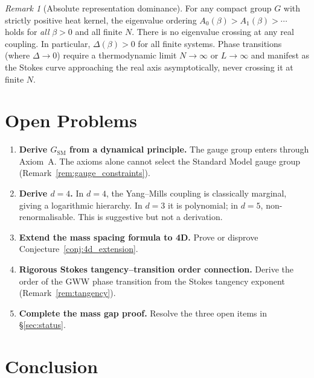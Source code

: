\documentclass[12pt]{article}
\theoremstyle{definition}
\theoremstyle{remark}
\newtheorem{remark}[theorem]{Remark}
\newcommand{\SM}{\mathrm{SM}}
\begin{document}
\begin{remark}[Absolute representation dominance]
\label{rem:absolute_dominance}
For any compact group $G$ with strictly positive heat kernel,
the eigenvalue ordering $A_0(\beta) > A_1(\beta) > \cdots$ holds
for \emph{all} $\beta > 0$ and all finite $N$.  There is no eigenvalue
crossing at any real coupling.  In particular, $\Delta(\beta) > 0$
for all finite systems.  Phase transitions (where $\Delta \to 0$)
require a thermodynamic limit $N \to \infty$ or $L \to \infty$
and manifest as the Stokes curve approaching the real axis
asymptotically, never crossing it at finite $N$.
\end{remark}

\section{Open Problems}
\label{sec:open}

\begin{enumerate}
\item \textbf{Derive $G_\SM$ from a dynamical principle.} The gauge
  group enters through Axiom~A. The axioms alone cannot select the
  Standard Model gauge group (Remark~\ref{rem:gauge_constraints}).

\item \textbf{Derive $d = 4$.} In $d = 4$, the Yang--Mills coupling
  is classically marginal, giving a logarithmic hierarchy. In $d = 3$
  it is polynomial; in $d = 5$, non-renormalisable. This is
  suggestive but not a derivation.

\item \textbf{Extend the mass spacing formula to 4D.}
  Prove or disprove Conjecture~\ref{conj:4d_extension}.

\item \textbf{Rigorous Stokes tangency--transition order connection.}
  Derive the order of the GWW phase transition from the Stokes
  tangency exponent (Remark~\ref{rem:tangency}).

\item \textbf{Complete the mass gap proof.} Resolve the three open
  items in \S\ref{sec:status}.
\end{enumerate}

\section{Conclusion}
\label{sec:conclusion}
\end{document}
